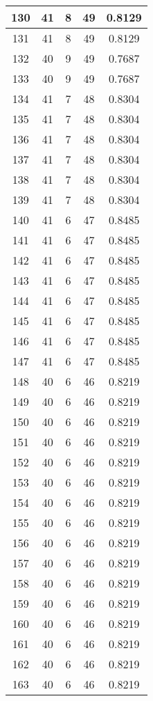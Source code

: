 \documentclass[letterpaper, 12pt]{article}
\begin{document}
\begin{longtable}{|c|c|c|c|c|}
\hline
130 & 41 & 8 & 49 & 0.8129 \\
\hline
131 & 41 & 8 & 49 & 0.8129 \\
\hline
132 & 40 & 9 & 49 & 0.7687 \\
\hline
133 & 40 & 9 & 49 & 0.7687 \\
\hline
134 & 41 & 7 & 48 & 0.8304 \\
\hline
135 & 41 & 7 & 48 & 0.8304 \\
\hline
136 & 41 & 7 & 48 & 0.8304 \\
\hline
137 & 41 & 7 & 48 & 0.8304 \\
\hline
138 & 41 & 7 & 48 & 0.8304 \\
\hline
139 & 41 & 7 & 48 & 0.8304 \\
\hline
140 & 41 & 6 & 47 & 0.8485 \\
\hline
141 & 41 & 6 & 47 & 0.8485 \\
\hline
142 & 41 & 6 & 47 & 0.8485 \\
\hline
143 & 41 & 6 & 47 & 0.8485 \\
\hline
144 & 41 & 6 & 47 & 0.8485 \\
\hline
145 & 41 & 6 & 47 & 0.8485 \\
\hline
146 & 41 & 6 & 47 & 0.8485 \\
\hline
147 & 41 & 6 & 47 & 0.8485 \\
\hline
148 & 40 & 6 & 46 & 0.8219 \\
\hline
149 & 40 & 6 & 46 & 0.8219 \\
\hline
150 & 40 & 6 & 46 & 0.8219 \\
\hline
151 & 40 & 6 & 46 & 0.8219 \\
\hline
152 & 40 & 6 & 46 & 0.8219 \\
\hline
153 & 40 & 6 & 46 & 0.8219 \\
\hline
154 & 40 & 6 & 46 & 0.8219 \\
\hline
155 & 40 & 6 & 46 & 0.8219 \\
\hline
156 & 40 & 6 & 46 & 0.8219 \\
\hline
157 & 40 & 6 & 46 & 0.8219 \\
\hline
158 & 40 & 6 & 46 & 0.8219 \\
\hline
159 & 40 & 6 & 46 & 0.8219 \\
\hline
160 & 40 & 6 & 46 & 0.8219 \\
\hline
161 & 40 & 6 & 46 & 0.8219 \\
\hline
162 & 40 & 6 & 46 & 0.8219 \\
\hline
163 & 40 & 6 & 46 & 0.8219 \\

\end{longtable}
\end{document}
